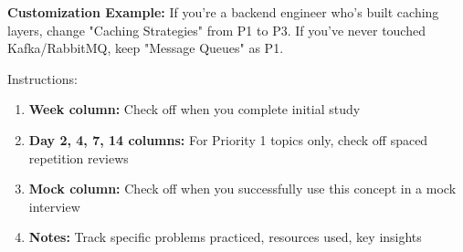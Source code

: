 \documentclass[10pt]{article}
\begin{document}
\textbf{Customization Example:} If you're a backend engineer who's built caching layers, change "Caching Strategies" from P1 to P3. If you've never touched Kafka/RabbitMQ, keep "Message Queues" as P1.

Instructions:
\begin{enumerate}
\item \textbf{Week column:} Check off when you complete initial study
\item \textbf{Day 2, 4, 7, 14 columns:} For Priority 1 topics only, check off spaced repetition reviews
\item \textbf{Mock column:} Check off when you successfully use this concept in a mock interview
\item \textbf{Notes:} Track specific problems practiced, resources used, key insights
\end{enumerate}
\end{document}
